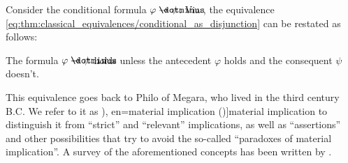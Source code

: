 \begin{concept}\label{con:material_implication}
  Consider the conditional formula \( \varphi \synimplies \psi \). Via , the equivalence \eqref{eq:thm:classical_equivalences/conditional_as_disjunction} can be restated as follows:
  \begin{displayquote}
    The formula \( \varphi \synimplies \psi \) holds unless the antecedent \( \varphi \) holds and the consequent \( \psi \) doesn't.
  \end{displayquote}

  This equivalence goes back to Philo of Megara, who lived in the third century B.C. We refer to it as \term[ru=материальная импликация (\cite[74]{КолмогоровДрагалин2006Логика}), en=material implication (\cite[9]{Kleene2002Logic})]{material implication} to distinguish it from \enquote{strict} and \enquote{relevant} implications, as well as \enquote{assertions} and other possibilities that try to avoid the so-called \enquote{paradoxes of material implication}. A survey of the aforementioned concepts has been written by .
\end{concept}
